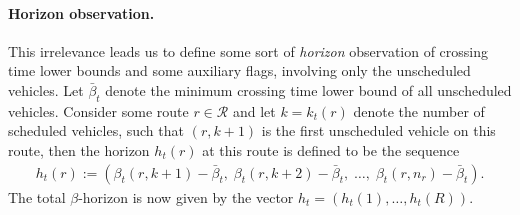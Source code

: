 \documentclass[a4paper]{report}
\theoremstyle{definition}
\theoremstyle{plain}
\begin{document}
\paragraph{Horizon observation.}
This irrelevance leads us to define some sort of \emph{horizon} observation of crossing
time lower bounds and some auxiliary flags, involving only the unscheduled
vehicles.
%
Let $\bar{\beta}_t$ denote the minimum crossing time lower bound of all unscheduled
vehicles.
%
Consider some route $r \in \mathcal{R}$ and let $k = k_t(r)$ denote the number
of scheduled vehicles, such that $(r, k+1)$ is the first unscheduled vehicle on
this route, then the horizon $h_t(r)$ at this route is defined to be the
sequence
\begin{align}
  h_t(r) := (\beta_t(r, k + 1) - \bar{\beta}_t, \; \beta_t(r, k + 2) - \bar{\beta}_t, \; \dots , \; \beta_t(r, n_r) - \bar{\beta}_t) .
\end{align}
%
The total $\beta$-horizon is now given by the vector
$h_t = (h_t(1), \dots, h_t(R))$.








\end{document}
